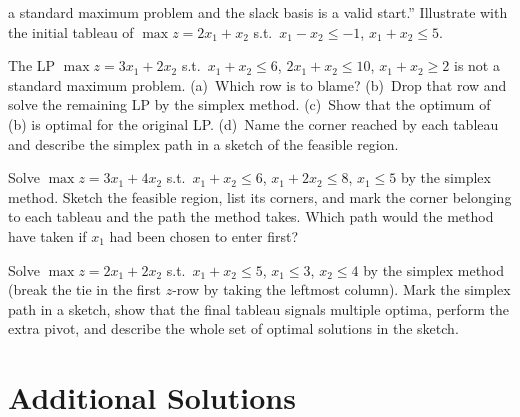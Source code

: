 \begin{problems}
        a standard maximum problem and the slack basis is a valid
        start.'' Illustrate with the initial tableau of
        $\max z=2x_1+x_2$ s.t.\ $x_1-x_2\le -1$, $x_1+x_2\le 5$.
  \item The LP $\max z=3x_1+2x_2$ s.t.\ $x_1+x_2\le 6$, $2x_1+x_2\le 10$,
        $x_1+x_2\ge 2$ is not a standard maximum problem. (a)~Which row is
        to blame? (b)~Drop that row and solve the remaining LP by the
        simplex method. (c)~Show that the optimum of (b) is optimal for
        the original LP. (d)~Name the corner reached by each tableau and
        describe the simplex path in a sketch of the feasible region.
  \item Solve $\max z=3x_1+4x_2$ s.t.\ $x_1+x_2\le 6$, $x_1+2x_2\le 8$,
        $x_1\le 5$ by the simplex method. Sketch the feasible region, list
        its corners, and mark the corner belonging to each tableau and the
        path the method takes. Which path would the method have taken if
        $x_1$ had been chosen to enter first?
  \item Solve $\max z=2x_1+2x_2$ s.t.\ $x_1+x_2\le 5$, $x_1\le 3$,
        $x_2\le 4$ by the simplex method (break the tie in the first
        $z$-row by taking the leftmost column). Mark the simplex path in a
        sketch, show that the final tableau signals multiple optima,
        perform the extra pivot, and describe the whole set of optimal
        solutions in the sketch.
\end{problems}

\section{Additional Solutions}


